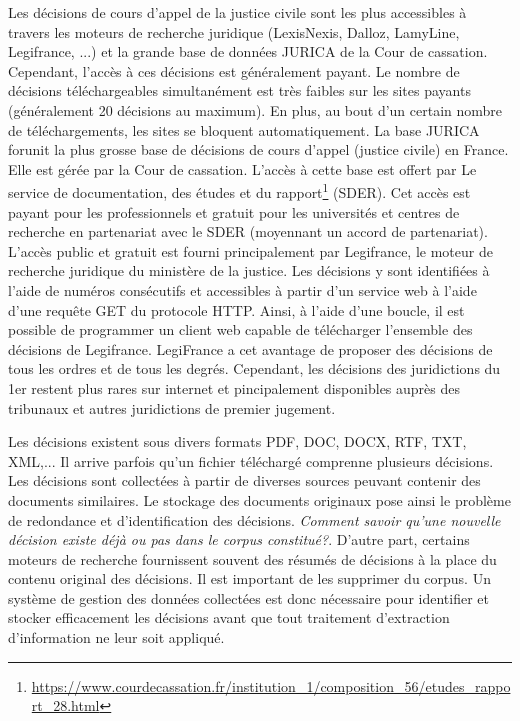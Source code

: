 Les décisions de cours d'appel de la justice civile sont les plus accessibles à travers les moteurs de recherche juridique (LexisNexis\textregistered, 
Dalloz\textregistered, LamyLine\textregistered, Legifrance\textregistered, ...) et la grande base de données JURICA de la Cour de cassation. Cependant, l'accès à ces décisions est généralement payant. Le nombre de décisions téléchargeables simultanément est très faibles sur les sites payants (généralement 20 décisions au maximum). En plus, au bout d'un certain nombre de téléchargements, les sites se bloquent automatiquement. La base JURICA forunit la plus grosse base de décisions de cours d'appel (justice civile) en France. Elle est gérée par la Cour de cassation. L'accès à cette base est offert par Le service de documentation, des études et du rapport\footnote{\url{https://www.courdecassation.fr/institution_1/composition_56/etudes_rapport_28.html}} (SDER). Cet accès est payant pour les professionnels et gratuit pour les universités et centres de recherche en partenariat avec le SDER (moyennant un accord de partenariat). L'accès public et gratuit est fourni principalement par Legifrance, le moteur de recherche juridique du ministère de la justice. Les décisions y sont identifiées à l'aide de numéros consécutifs et accessibles à partir d'un service web à l'aide d'une requête GET du protocole HTTP. Ainsi, à l'aide d'une boucle, il est possible de programmer un client web capable de télécharger l'ensemble des décisions de Legifrance. LegiFrance a cet avantage de proposer des décisions de tous les ordres et de tous les degrés. Cependant, les décisions des juridictions du 1er restent plus rares sur internet et pincipalement disponibles auprès des tribunaux et autres juridictions de premier jugement.

Les décisions existent sous divers formats PDF, DOC, DOCX, RTF, TXT, XML,... Il arrive parfois qu'un fichier téléchargé comprenne plusieurs décisions. Les décisions sont collectées à partir de diverses sources peuvant contenir des documents similaires. Le stockage des documents originaux pose ainsi le problème de redondance et d'identification des décisions. \textit{Comment savoir qu'une nouvelle décision existe déjà ou pas dans le corpus constitué?}. D'autre part, certains moteurs de recherche fournissent souvent des résumés de décisions à la place du contenu original des décisions. Il est important de les supprimer du corpus. Un système de gestion des données collectées est donc nécessaire pour identifier et stocker efficacement les décisions avant que tout traitement d'extraction d'information ne leur soit appliqué.

